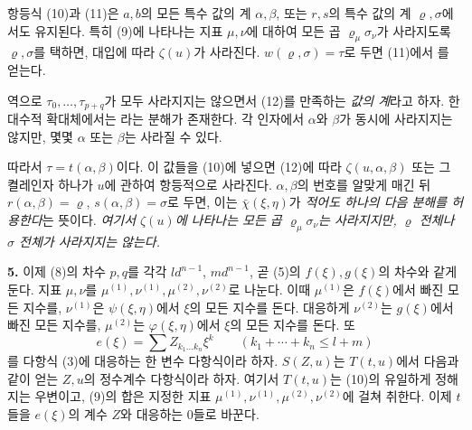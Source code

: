 항등식 (10)과 (11)은 \(a,b\)의 모든 특수 값의 계 \(\alpha,\beta\), 또는 \(r,s\)의 특수 값의 계 \(\varrho,\sigma\)에서도 유지된다. 특히 (9)에 나타나는 지표 \(\mu,\nu\)에 대하여 모든 곱 \(\varrho_\mu\sigma_\nu\)가 사라지도록 \(\varrho,\sigma\)를 택하면, 대입에 따라 \(\zeta(u)\)가 사라진다. \(w(\varrho,\sigma)=\tau\)로 두면 (11)에서
를 얻는다.

역으로 \(\tau_0,\ldots,\tau_{p+q}\)가 모두 사라지지는 않으면서 (12)를 만족하는 \emph{값의 계}라고 하자. 한 대수적 확대체에서는
라는 분해가 존재한다. 각 인자에서 \(\alpha\)와 \(\beta\)가 동시에 사라지지는 않지만, 몇몇 \(\alpha\) 또는 \(\beta\)는 사라질 수 있다.
\addtocounter{footnote}{1}
따라서 \(\tau=t(\alpha,\beta)\)이다. 이 값들을 (10)에 넣으면 (12)에 따라 \(\zeta(u,\alpha,\beta)\) 또는 그 켤레인자 하나가 \(u\)에 관하여 항등적으로 사라진다. \(\alpha,\beta\)의 번호를 알맞게 매긴 뒤 \(r(\alpha,\beta)=\varrho\), \(s(\alpha,\beta)=\sigma\)로 두면, 이는 \(\bar\chi(\xi,\eta)\)가 \emph{적어도 하나의 다음 분해를 허용한다}는 뜻이다.
\emph{여기서 \(\zeta(u)\)에 나타나는 모든 곱 \(\varrho_\mu\sigma_\nu\)는 사라지지만, \(\varrho\) 전체나 \(\sigma\) 전체가 사라지지는 않는다.}

\textbf{5.} 이제 (8)의 차수 \(p,q\)를 각각 \(ld^{n-1}\), \(md^{n-1}\), 곧 (5)의 \(f(\xi),g(\xi)\)의 차수와 같게 둔다. 지표 \(\mu,\nu\)를 \(\mu^{(1)},\nu^{(1)},\mu^{(2)},\nu^{(2)}\)로 나눈다. 이때 \(\mu^{(1)}\)은 \(f(\xi)\)에서 빠진 모든 지수를, \(\nu^{(1)}\)은 \(\psi(\xi,\eta)\)에서 \(\xi\)의 모든 지수를 돈다. 대응하게 \(\nu^{(2)}\)는 \(g(\xi)\)에서 빠진 모든 지수를, \(\mu^{(2)}\)는 \(\varphi(\xi,\eta)\)에서 \(\xi\)의 모든 지수를 돈다. 또
\[
e(\xi)=\sum Z_{k_1\ldots k_n}\xi^k
\qquad(k_1+\cdots+k_n\le l+m)
\]
를 다항식 (3)에 대응하는 한 변수 다항식이라 하자. \(S(Z,u)\)는 \(T(t,u)\)에서 다음과 같이 얻는 \(Z,u\)의 정수계수 다항식이라 하자. 여기서 \(T(t,u)\)는 (10)의 유일하게 정해지는 우변이고, (9)의 합은 지정한 지표 \(\mu^{(1)},\nu^{(1)},\mu^{(2)},\nu^{(2)}\)에 걸쳐 취한다. 이제 \(t\)들을 \(e(\xi)\)의 계수 \(Z\)와 대응하는 0들로 바꾼다.

